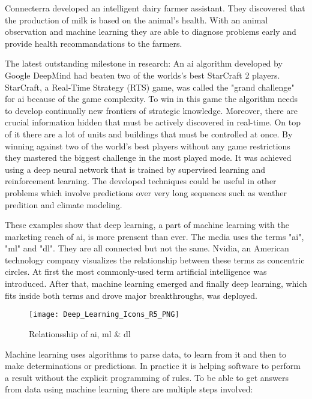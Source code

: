 Connecterra developed an intelligent dairy farmer assistant.
They discovered that the production of milk is based on the animal’s health.
With an animal observation and machine learning they are able to diagnose problems early and provide health recommandations to the farmers.
\cite{tensorflow-stories, connecterra-video, connecterra-web}

The latest outstanding milestone in research: An \acrshort{ai} algorithm developed by Google DeepMind had beaten two of the worlds's best StarCraft 2 players.
StarCraft, a Real-Time Strategy (RTS) game, was called the "grand challenge" for \acrshort{ai} because of the game complexity.
To win in this game the algorithm needs to develop continually new frontiers of strategic knowledge.
Moreover, there are crucial information hidden that must be actively discovered in real-time. On top of it there are a lot of units and buildings that must be controlled at once.
By winning against two of the world's best players without any game restrictions they mastered the biggest challenge in the most played mode.
It was achieved using a deep neural network that is trained by supervised learning and reinforcement learning.
The developed techniques could be useful in other problems which involve predictions over very long sequences such as weather predition and climate modeling.
\cite{alphastar}

These examples show that deep learning, a part of machine learning with the marketing reach of \acrlong{ai}, is more prensent than ever.
The media uses the terms "\acrfull{ai}", "\acrfull{ml}" and "\acrfull{dl}". They are all connected but not the same.
\hfill \break
Nvidia, an American technology company visualizes the relationship between these terms as concentric circles.
At first the most commonly-used term artificial intelligence was introduced.
After that, machine learning emerged and finally deep learning, which fits inside both terms and drove major breakthroughs, was deployed.
\cite{nvidia-ai-explained}

\begin{figure}[H]
    \centering
    \texttt{[image: Deep\_Learning\_Icons\_R5\_PNG]}
    \caption{\cite[page 5]{nvidia-ai-explained} Relationsship of \acrshort{ai}, \acrshort{ml} \& \acrshort{dl}}
    \label{fig:ai_ml_dl_termns}
\end{figure}

Machine learning uses algorithms to parse data, to learn from it and then to make determinations or predictions.
In practice it is helping software to perform a result without the explicit programming of rules.
To be able to get answers from data using machine learning there are multiple steps involved:
\cite{nvidia-ai-explained, tensorflow-about}

